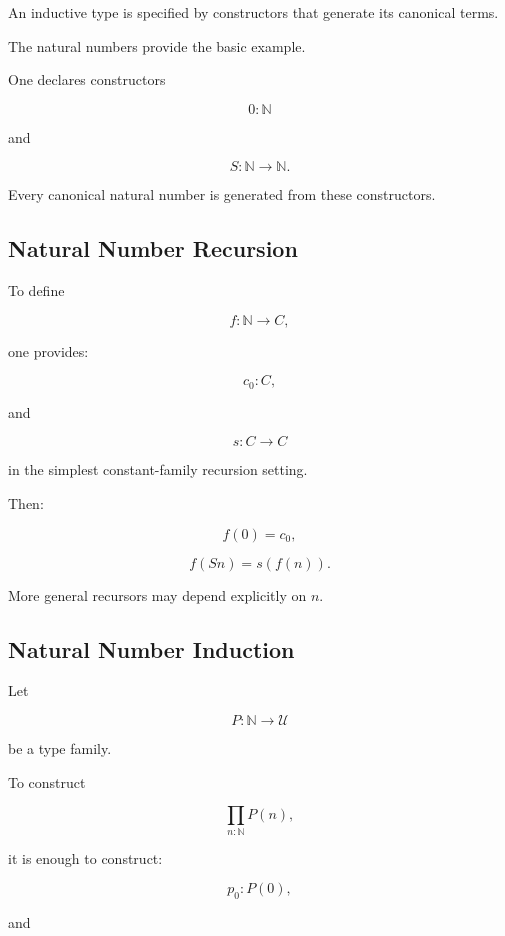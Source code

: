 An inductive type is specified by constructors that generate its canonical
terms.

The natural numbers provide the basic example.

One declares constructors

\[
\boxed{
0:\mathbb{N}
}
\]

and

\[
\boxed{
S:\mathbb{N}\to\mathbb{N}.
}
\]

Every canonical natural number is generated from these constructors.

\subsection{Natural Number Recursion}
\label{subsec:natural-number-recursion-type-theory}

To define

\[
f:\mathbb{N}\to C,
\]

one provides:

\[
\boxed{
c_0:C,
}
\]

and

\[
\boxed{
s:C\to C
}
\]

in the simplest constant-family recursion setting.

Then:

\[
\boxed{
f(0)=c_0,
}
\]

\[
\boxed{
f(Sn)=s(f(n)).
}
\]

More general recursors may depend explicitly on \(n\).

\subsection{Natural Number Induction}
\label{subsec:natural-number-induction-type-theory}

Let

\[
P:\mathbb{N}\to\mathcal{U}
\]

be a type family.

To construct

\[
\boxed{
\prod_{n:\mathbb{N}}P(n),
}
\]

it is enough to construct:

\[
\boxed{
p_0:P(0),
}
\]

and

